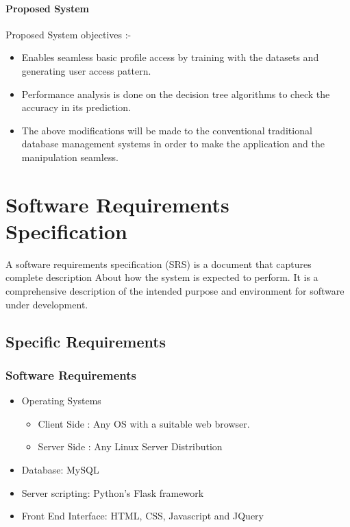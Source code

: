 \documentclass[12pt]{report}
\begin{document}
\subsubsection*{Proposed System} 

Proposed System objectives :-
\begin{itemize}
\item Enables seamless  basic profile access by training with the datasets and generating user access pattern.
\item Performance analysis is done on the decision tree algorithms to check the accuracy in its prediction.
\item The above modifications will be made to the conventional traditional database management systems in order to make the application and the manipulation seamless.

\end{itemize}




\chapter{Software Requirements Specification}\label{ch:srr}
A software requirements specification (SRS) is a document that captures complete description      
About how the system is expected to perform. It is a comprehensive description of the intended purpose and environment for software under development.

\section{Specific Requirements} 

\subsection{Software Requirements}

\begin{itemize}
\item Operating Systems
\begin{itemize}
\item Client Side : Any OS with a suitable web browser. 
\item Server Side : Any Linux Server Distribution

\end{itemize}

\item Database: MySQL 
\item  Server scripting: Python’s Flask framework
\item Front End Interface: HTML, CSS, Javascript and JQuery
\end{itemize}
\end{document}
